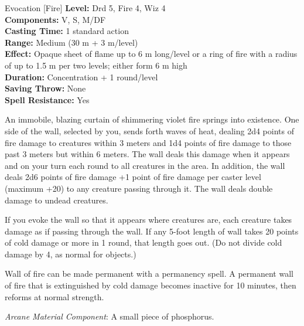 {Evocation [Fire]}
{
	\textbf{Level:}
	Drd 5, Fire 4, Wiz 4\\
	\textbf{Components:}
	V, S, M/DF\\
	\textbf{Casting Time:}
	1 standard action\\
	\textbf{Range:}
	Medium (30 m + 3 m/level)\\
	\textbf{Effect:}
	Opaque sheet of flame up to 6 m long/level or a ring of fire with a radius of up to 1.5 m per two levels; either form 6 m high\\
	\textbf{Duration:}
	Concentration + 1 round/level\\
	\textbf{Saving Throw:}
	None\\
	\textbf{Spell Resistance:}
	Yes\\
}
{
	An immobile, blazing curtain of shimmering violet fire springs into existence. One side of the wall, selected by you, sends forth waves of heat, dealing 2d4 points of fire damage to creatures within 3 meters and 1d4 points of fire damage to those past 3 meters but within 6 meters. The wall deals this damage when it appears and on your turn each round to all creatures in the area. In addition, the wall deals 2d6 points of fire damage +1 point of fire damage per caster level (maximum +20) to any creature passing through it. The wall deals double damage to undead creatures.

	If you evoke the wall so that it appears where creatures are, each creature takes damage as if passing through the wall. If any 5-foot length of wall takes 20 points of cold damage or more in 1 round, that length goes out. (Do not divide cold damage by 4, as normal for objects.)

	Wall of fire can be made permanent with a permanency spell. A permanent wall of fire that is extinguished by cold damage becomes inactive for 10 minutes, then reforms at normal strength.

	\textit{Arcane Material Component}:
	A small piece of phosphorus.

}
